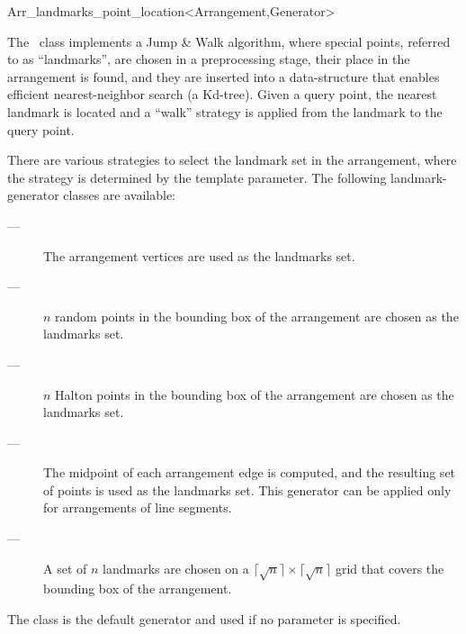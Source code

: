 
\ccRefPageBegin

\begin{ccRefClass}{Arr_landmarks_point_location<Arrangement,Generator>}
\label{arr_ref:lm_pl}

The \ccRefName\ class implements a Jump \& Walk algorithm, where special
points, referred to as ``landmarks'', are chosen in a preprocessing stage,
their place in the arrangement is found, and they are inserted into a
data-structure that enables efficient nearest-neighbor search (a
{\sc Kd}-tree). Given a query point, the nearest landmark is located and a
``walk'' strategy is applied from the landmark to the query point.

There are various strategies to select the landmark set in the
arrangement, where the strategy is determined by the
 template parameter. The following landmark-generator
classes are available:
\begin{description}
\item[ ---]
The arrangement vertices are used as the landmarks set.

\item[ ---]
$n$ random points in the bounding box of the arrangement are chosen
as the landmarks set.

\item[ ---]
$n$ Halton points in the bounding box of the arrangement are chosen
as the landmarks set.

\item[ ---]
The midpoint of each arrangement edge is computed, and the resulting
set of points is used as the landmarks set. This generator can be applied
only for arrangements of line segments.

\item[ ---]
A set of $n$ landmarks are chosen on a
$\lceil \sqrt{n} \rceil \times \lceil \sqrt{n} \rceil$
grid that covers the bounding box of the arrangement.
\end{description}
The  class is the default generator
and used if no  parameter is specified.


\end{ccRefClass}
